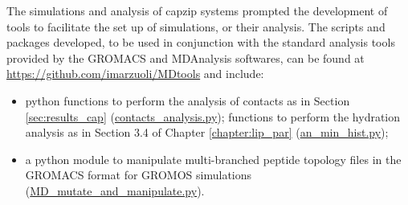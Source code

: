 The simulations and analysis of capzip systems prompted the development of tools to facilitate the set up of simulations, or their analysis.
%
The scripts and packages developed, to be used in conjunction with the standard analysis tools provided by the GROMACS and MDAnalysis softwares, can be found at \url{https://github.com/imarzuoli/MDtools} and include:
\begin{itemize}
\item python functions to perform the analysis of contacts as in Section \ref{sec:results_cap} (\url{contacts_analysis.py}); functions to perform the hydration analysis as in Section 3.4 of Chapter \ref{chapter:lip_par} (\url{an_min_hist.py});

\item a python module to manipulate multi-branched peptide topology files in the GROMACS format for GROMOS simulations (\url{MD_mutate_and_manipulate.py}).

\end{itemize}

